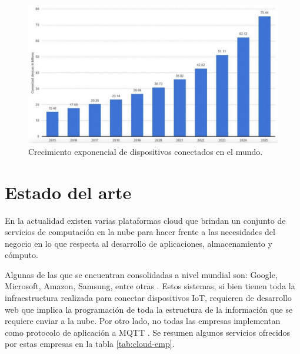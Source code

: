 \begin{figure}[htpb]
	\centering
	\includegraphics[scale=.3]{./Figures/iot-crecimiento.png}
	\caption[Crecimiento de dispositivos IoT]{Crecimiento exponencial de dispositivos conectados en el mundo\protect\footnotemark.}
	\label{fig:iot-crecimiento}
\end{figure}




\section{Estado del arte}
\label{sec:estado-arte}
En la actualidad existen varias plataformas cloud que brindan un conjunto de servicios de computación en la nube para hacer frente a las necesidades del negocio en lo que respecta al desarrollo de aplicaciones, almacenamiento y cómputo. 

Algunas de las que se encuentran consolidadas a nivel mundial son: Google, Microsoft, Amazon, Samsung, entre otras \citep{WEBSITE:6}.  Estos sistemas, si bien tienen toda la infraestructura realizada para conectar dispositivos IoT, requieren de desarrollo web que implica la programación de toda la estructura de la información que se requiere enviar a la nube.  Por otro lado,  no todas las empresas implementan como protocolo de aplicación a MQTT \citep{WEBSITE:7}.  Se resumen algunos servicios ofrecidos por estas empresas en la tabla \ref{tab:cloud-emp}.

